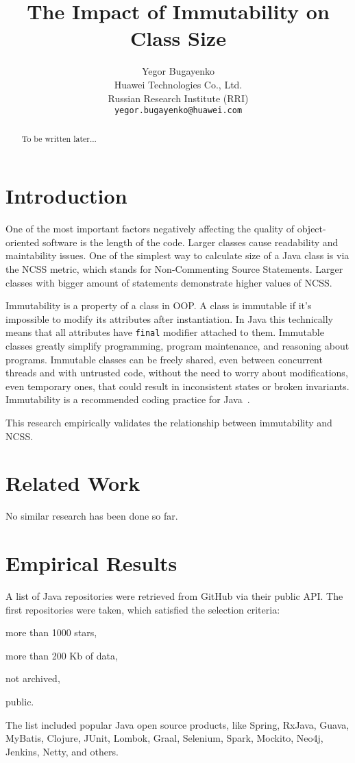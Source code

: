 \documentclass[12pt]{article}
\title{The Impact of Immutability on Class Size}
\author{Yegor Bugayenko\\Huawei Technologies Co., Ltd.\\Russian Research Institute (RRI)\\\texttt{yegor.bugayenko@huawei.com}}{}{}
\begin{document}
\raggedbottom
\maketitle

\begin{abstract}
To be written later...
\end{abstract}

\section{Introduction}

One of the most important factors negatively affecting the quality
of object-oriented software is the length of the code. Larger classes
cause readability and maintability issues. One of the simplest way
to calculate size of a Java class is via the NCSS metric, which
stands for Non-Commenting Source Statements. Larger classes with bigger
amount of statements demonstrate higher values of NCSS.

Immutability is a property of a class in OOP. A class is immutable if
it's impossible to modify its attributes after instantiation. In Java this
technically means that all attributes have \texttt{final} modifier attached
to them.
Immutable classes greatly simplify programming, program maintenance, and
reasoning about programs. Immutable classes can be freely shared, even between
concurrent threads and with untrusted code, without the need to worry
about modifications, even temporary ones, that could result in
inconsistent states or broken invariants.
Immutability is a recommended coding practice for Java~\cite{bloch2016}.

This research empirically validates the relationship between immutability
and NCSS.

\section{Related Work}

No similar research has been done so far.

\section{Empirical Results}

A list of Java repositories were retrieved from GitHub via their
public API. The first \totalrepos{} repositories were taken, which satisfied
the selection criteria:
\begin{enumerate*}[label={\arabic*)}]
\item more than 1000 stars,
\item more than 200 Kb of data,
\item not archived,
\item public.
\end{enumerate*}
The list included popular Java open source products, like
Spring, RxJava, Guava, MyBatis, Clojure, JUnit, Lombok,
Graal, Selenium, Spark, Mockito, Neo4j, Jenkins, Netty, and others.
\end{document}
